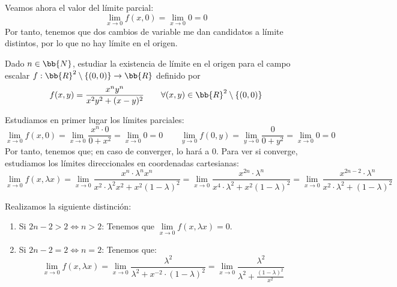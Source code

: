 \begin{ejercicio}
\begin{enumerate}
\begin{enumerate}
            Veamos ahora el valor del límite parcial:
            \begin{equation*}
                \lim_{x\to 0}f(x,0) =
                \lim_{x\to 0}0 = 0
            \end{equation*}
            Por tanto, tenemos que dos cambios de variable me dan candidatos a límite distintos, por lo que no hay límite en el origen.
        \end{enumerate}
    \end{enumerate}
\end{ejercicio}


\begin{ejercicio}
    Dado $n \in \bb{N}$, estudiar la existencia de límite en el origen para el campo escalar $f : \bb{R}^2\setminus\{(0,0)\} \to \bb{R}$ definido por
    \begin{equation*}
        f(x,y)=\frac{x^ny^n}{x^2y^2+(x-y)^2} \qquad \forall (x,y)\in \bb{R}^2\setminus \{(0,0)\}
    \end{equation*}

    Estudiamos en primer lugar los límites parciales:
    \begin{equation*}
        \lim_{x\to 0}f(x,0)=
        \lim_{x\to 0} \frac{x^n\cdot 0}{0+x^2} =
        \lim_{x\to 0} 0 = 0
        \qquad
        \lim_{y\to 0}f(0,y)=
        \lim_{y\to 0}\frac{0}{0 + y^2}=
        \lim_{x\to 0}0 = 0
    \end{equation*}
    Por tanto, tenemos que; en caso de converger, lo hará a 0. Para ver si converge, estudiamos los límites direccionales en coordenadas cartesianas:
    \begin{equation*}
        \lim\limits_{x\to 0}f(x,\lambda x)
        = \lim_{x\to 0} \frac{x^n\cdot \lambda^nx^n}{x^2\cdot \lambda^2x^2 + x^2(1-\lambda)^2}
        = \lim_{x\to 0} \frac{x^{2n}\cdot \lambda^n}{x^4\cdot \lambda^2 + x^2(1-\lambda)^2}
        = \lim_{x\to 0} \frac{x^{2n-2}\cdot \lambda^n}{x^2\cdot \lambda^2 + (1-\lambda)^2}
    \end{equation*}

    Realizamos la siguiente distinción:
    \begin{enumerate}
        \item Si $2n-2>2\Longleftrightarrow n>2$: Tenemos que $\lim\limits_{x\to 0}f(x,\lambda x)=0$.

        \item Si $2n-2=2\Longleftrightarrow n=2$: Tenemos que:
        $$\lim\limits_{x\to 0}f(x,\lambda x)
        =\lim\limits_{x\to 0}\dfrac{\lambda^2}{\lambda^2 + x^{-2}\cdot(1-\lambda)^2}
        =\lim\limits_{x\to 0}\dfrac{\lambda^2}{\lambda^2 + \frac{(1-\lambda)^2}{x^{2}}}$$


\end{enumerate}
\end{ejercicio}
